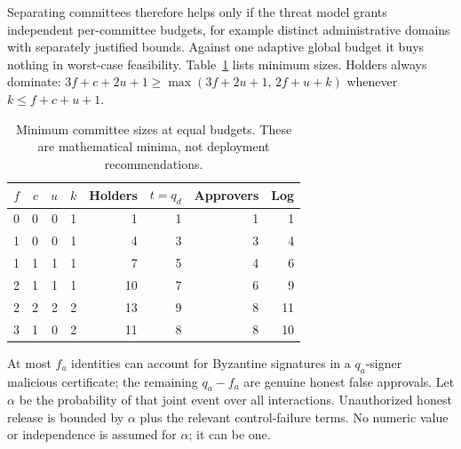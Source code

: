 \documentclass[pdflatex,sn-mathphys-num]{sn-jnl}
\theoremstyle{plain}
\theoremstyle{definition}
\begin{document}
Separating committees therefore helps only if the threat model grants independent per-committee budgets, for example distinct administrative domains with separately justified bounds. Against one adaptive global budget it buys nothing in worst-case feasibility. Table~\ref{tab:sensitivity} lists minimum sizes. Holders always dominate: $3f+c+2u+1\ge\max(3f+2u+1,\,2f+u+k)$ whenever $k\le f+c+u+1$.

\begin{table}[htbp]
\caption{Minimum committee sizes at equal budgets. These are mathematical minima, not deployment recommendations.}\label{tab:sensitivity}
\centering\small
\begin{tabular}{@{}rrrrrrrr@{}}\toprule
$f$&$c$&$u$&$k$&Holders&$t=q_d$&Approvers&Log\\\midrule
0&0&0&1&1&1&1&1\\
1&0&0&1&4&3&3&4\\
1&1&1&1&7&5&4&6\\
2&1&1&1&10&7&6&9\\
2&2&2&2&13&9&8&11\\
3&1&0&2&11&8&8&10\\\bottomrule
\end{tabular}
\end{table}

At most $f_a$ identities can account for Byzantine signatures in a $q_a$-signer malicious certificate; the remaining $q_a-f_a$ are genuine honest false approvals. Let $\alpha$ be the probability of that joint event over all interactions. Unauthorized honest release is bounded by $\alpha$ plus the relevant control-failure terms. No numeric value or independence is assumed for $\alpha$; it can be one.
\end{document}
